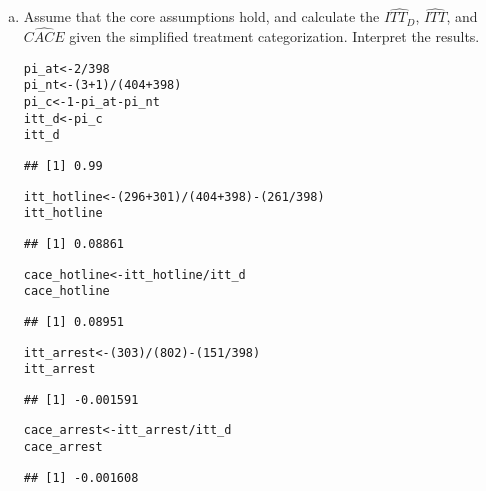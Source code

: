 \documentclass[11pt,notitlepage]{article}\usepackage[]{graphicx}\usepackage[]{color}
\makeatletter
\newcommand{\hlnum}[1]{\textcolor[rgb]{0.686,0.059,0.569}{#1}}%
\newcommand{\hlopt}[1]{\textcolor[rgb]{0,0,0}{#1}}%
\newcommand{\hlstd}[1]{\textcolor[rgb]{0.345,0.345,0.345}{#1}}%
\newcommand{\hlkwb}[1]{\textcolor[rgb]{0.69,0.353,0.396}{#1}}%
\newenvironment{kframe}{%
 \def\at@end@of@kframe{}%
 \ifinner\ifhmode%
  \def\at@end@of@kframe{\end{minipage}}%
  \begin{minipage}{\columnwidth}%
 \fi\fi%
 \def\FrameCommand##1{\hskip\@totalleftmargin \hskip-\fboxsep
 \colorbox{shadecolor}{##1}\hskip-\fboxsep
     \hskip-\linewidth \hskip-\@totalleftmargin \hskip\columnwidth}%
 \MakeFramed {\advance\hsize-\width
   \@totalleftmargin\z@ \linewidth\hsize
   \@setminipage}}%
 {\par\unskip\endMakeFramed%
 \at@end@of@kframe}
\newenvironment{knitrout}{}{} %
\makeatother
\begin{document}
\begin{enumerate}[a)]
\item Assume that the core assumptions hold, and calculate the $\widehat{ITT_D}$, $\widehat{ITT}$, and $\widehat{CACE}$ given the simplified treatment categorization. Interpret the results.\\
\begin{knitrout}
\color{fgcolor}\begin{kframe}
\begin{alltt}
\hlstd{pi_at} \hlkwb{<-} \hlnum{2}\hlopt{/}\hlnum{398}
\hlstd{pi_nt} \hlkwb{<-} \hlstd{(}\hlnum{3}\hlopt{+}\hlnum{1}\hlstd{)}\hlopt{/}\hlstd{(}\hlnum{404}\hlopt{+}\hlnum{398}\hlstd{)}
\hlstd{pi_c} \hlkwb{<-} \hlnum{1} \hlopt{-} \hlstd{pi_at} \hlopt{-} \hlstd{pi_nt}
\hlstd{itt_d} \hlkwb{<-} \hlstd{pi_c}
\hlstd{itt_d}
\end{alltt}
\begin{verbatim}
## [1] 0.99
\end{verbatim}
\begin{alltt}
\hlstd{itt_hotline} \hlkwb{<-} \hlstd{(}\hlnum{296} \hlopt{+} \hlnum{301}\hlstd{)}\hlopt{/}\hlstd{(}\hlnum{404} \hlopt{+} \hlnum{398}\hlstd{)} \hlopt{-} \hlstd{(}\hlnum{261}\hlopt{/}\hlnum{398}\hlstd{)}
\hlstd{itt_hotline}
\end{alltt}
\begin{verbatim}
## [1] 0.08861
\end{verbatim}
\begin{alltt}
\hlstd{cace_hotline} \hlkwb{<-} \hlstd{itt_hotline}\hlopt{/}\hlstd{itt_d}
\hlstd{cace_hotline}
\end{alltt}
\begin{verbatim}
## [1] 0.08951
\end{verbatim}
\begin{alltt}
\hlstd{itt_arrest} \hlkwb{<-} \hlstd{(}\hlnum{303}\hlstd{)}\hlopt{/}\hlstd{(}\hlnum{802}\hlstd{)} \hlopt{-} \hlstd{(}\hlnum{151}\hlopt{/}\hlnum{398}\hlstd{)}
\hlstd{itt_arrest}
\end{alltt}
\begin{verbatim}
## [1] -0.001591
\end{verbatim}
\begin{alltt}
\hlstd{cace_arrest} \hlkwb{<-} \hlstd{itt_arrest}\hlopt{/}\hlstd{itt_d}
\hlstd{cace_arrest}
\end{alltt}
\begin{verbatim}
## [1] -0.001608
\end{verbatim}
\end{kframe}
\end{knitrout}


\end{enumerate}
\end{document}
